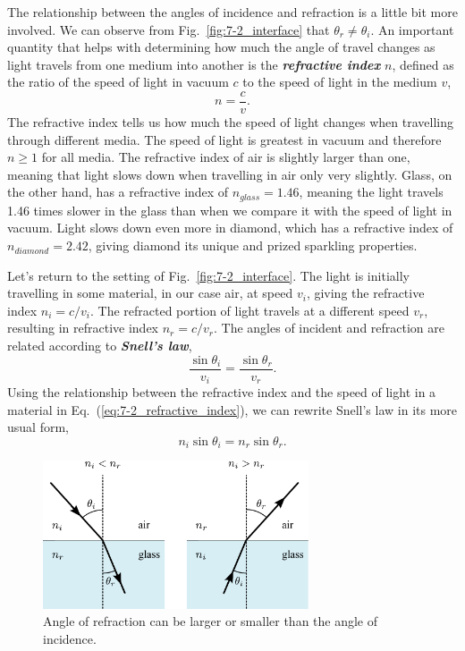 The relationship between the angles of incidence and refraction is a little bit more involved.
We can observe from Fig.~\ref{fig:7-2_interface} that $\theta_r \neq \theta_i$.
An important quantity that helps with determining how much the angle of travel changes as light travels from one medium into another is the \textit{\textbf{refractive index}} $n$, defined as the ratio of the speed of light in vacuum $c$ to the speed of light in the medium $v$,
\begin{equation}
    n = \frac{c}{v}.
    \label{eq:7-2_refractive_index}
\end{equation}
The refractive index tells us how much the speed of light changes when travelling through different media.
The speed of light is greatest in vacuum and therefore $n\geq 1$ for all media.
The refractive index of air is slightly larger than one, meaning that light slows down when travelling in air only very slightly.
Glass, on the other hand, has a refractive index of $n_{glass} = 1.46$, meaning the light travels 1.46 times slower in the glass than when we compare it with the speed of light in vacuum.
Light slows down even more in diamond, which has a refractive index of $n_{diamond} = 2.42$, giving diamond its unique and prized sparkling properties.

Let's return to the setting of Fig.~\ref{fig:7-2_interface}.
The light is initially travelling in some material, in our case air, at speed $v_i$, giving the refractive index $n_i = c / v_i$.
The refracted portion of light travels at a different speed $v_r$, resulting in refractive index $n_r = c / v_r$.
The angles of incident and refraction are related according to \textit{\textbf{Snell's law}},
\begin{equation}
    \frac{\sin\theta_i}{v_i} = \frac{\sin\theta_r}{v_r}.
\end{equation}
Using the relationship between the refractive index and the speed of light in a material in Eq.~(\ref{eq:7-2_refractive_index}), we can rewrite Snell's law in its more usual form,
\begin{equation}
    n_i \sin \theta_i = n_r \sin \theta_r.
    \label{eq:7-2_snell}
\end{equation}

\begin{figure}
    \centering
    \includegraphics[width=0.7\textwidth]{lesson7/7-2_snell.pdf}
    \caption[Snell's law]{Angle of refraction can be larger or smaller than the angle of incidence.}
    \label{fig:7-2_snell_law}
\end{figure}


